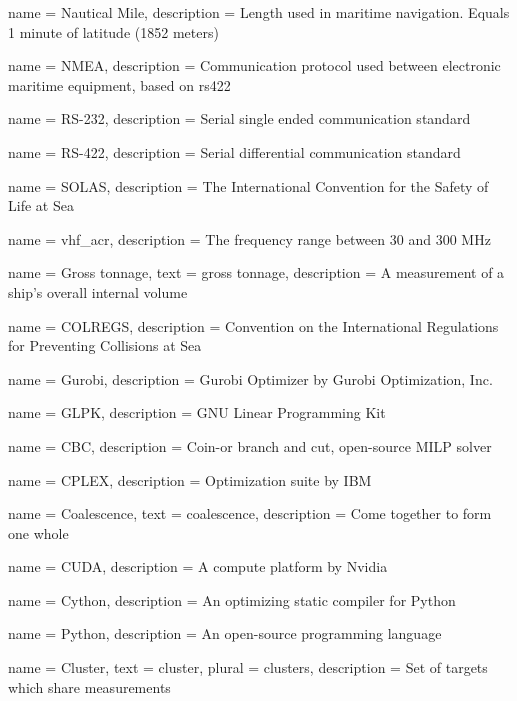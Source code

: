 {
	name 		= Nautical Mile,
	description = {Length used in maritime navigation. Equals 1 minute of latitude (1852 meters)}
}

{
	name 		= NMEA,
	description = {Communication protocol used between electronic maritime equipment, based on \gls{rs422}}
}

{
	name 		= RS-232,
	description = {Serial single ended communication standard}
}

{
	name 		= RS-422,
	description = {Serial differential communication standard}
}


{
	name 		= SOLAS,
	description = {The International Convention for the Safety of Life at Sea}
}

{
	name 		= \gls{vhf_acr},
	description = {The frequency range between 30 and 300 MHz}
}

{
	name 		= Gross tonnage,
	text 		= gross tonnage,
	description = {A measurement of a ship's overall internal volume}
}

{
	name 		= COLREGS,
	description = {Convention on the International Regulations for Preventing Collisions at Sea}
}

{
	name 		= Gurobi,
	description = {Gurobi Optimizer by Gurobi Optimization, Inc.}
}

{
	name 		= GLPK,
	description = {GNU Linear Programming Kit}
}

{
	name 		= CBC,
	description = {Coin-or branch and cut, open-source MILP solver}
}

{
	name 		= CPLEX,
	description = {Optimization suite by IBM}
}

{
	name 		= Coalescence,
	text 		= coalescence,
	description = {Come together to form one whole}
}

{
	name 		= CUDA,
	description = {A compute platform by Nvidia}
}

{
	name 		= Cython,
	description = {An optimizing static compiler for Python}
}

{
	name 		= Python,
	description = {An open-source programming language}
}

{
	name 		= Cluster,
	text 		= cluster,
	plural 		= clusters,
	description = {Set of \glspl{target} which share \glspl{measurement}}
}


